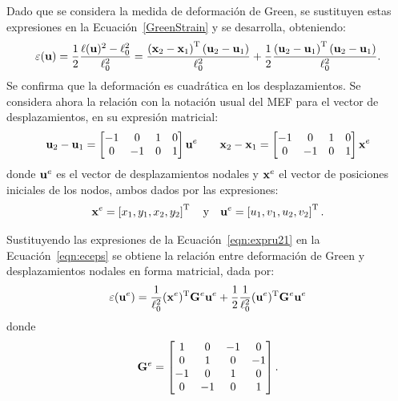 Dado que se considera la medida de deformación de Green, se sustituyen estas expresiones en la Ecuación~\eqref{GreenStrain} y se desarrolla, obteniendo:
%
\begin{equation}\label{eqn:eceps}
\varepsilon({\bf u}) 
= \frac{1}{2} \frac{\ell({\bf u})^2 - \ell_0^2}{\ell^2_0} 
= \frac{  \left({\bf x}_{2}-{\bf x}_1 \right)^{\text{T}} \left({\bf u}_{2}-{\bf u}_1 \right) }{\ell^2_0}
+ \frac{1}{2} \frac{ \left({\bf u}_{2}-{\bf u}_1 \right)^{\text{T}} \left({\bf u}_{2}-{\bf u}_1 \right) }{\ell^2_0}.
\end{equation}
%
Se confirma que la deformación es cuadrática en los desplazamientos. %
%
Se considera ahora la relación con la notación usual del MEF para el vector de desplazamientos, en su expresión matricial:
%
\begin{equation}\label{eqn:expru21}
{\bf u}_2 - {\bf u}_1 = \left[ \begin{matrix}
-1 & 0 &  1 &  0 \\
0 & -1 &  0 &  1 \\
\end{matrix} 
\right] {\bf u}^e
\qquad
{\bf x}_2 - {\bf x}_1 = \left[ \begin{matrix}
-1 & 0 &  1 &  0 \\
0 & -1 &  0 &  1 \\
\end{matrix} 
\right] {\bf x}^e
\end{equation}
%
donde ${\bf u}^e$ es el vector de desplazamientos nodales y ${\bf x}^e$ el vector de posiciones iniciales de los nodos, ambos dados por las expresiones:
%
\begin{equation}
{\bf x}^e = \left[ x_1, y_1, x_2, y_2 \right]^{\text{T}}
\quad \text{y} \quad
{\bf u}^e = \left[ u_1, v_1, u_2, v_2 \right]^{\text{T}}.
\end{equation}
%


Sustituyendo las expresiones de la Ecuación~\eqref{eqn:expru21} en la Ecuación~\eqref{eqn:eceps} se obtiene la relación entre deformación de Green y desplazamientos nodales en forma matricial, dada por:
%
\begin{equation}
\varepsilon ({\bf u}^e) = \frac{1}{\ell_0^2} 
({\bf x}^e)^{\text{T}} {\bf G}^e {\bf u}^e +  \frac{1}{2} \frac{1}{\ell_0^2}  ({\bf u}^e)^{\text{T}} {\bf G}^e {\bf u}^e
\end{equation}
%
donde
%
\begin{equation}
{\bf G}^e =
\left[\begin{matrix}
1 & 0 & -1 & 0\\
0 & 1 &0 & -1\\
-1 & 0& 1 & 0\\
0 & -1 &0 & 1\\
\end{matrix}
\right].
\end{equation}


